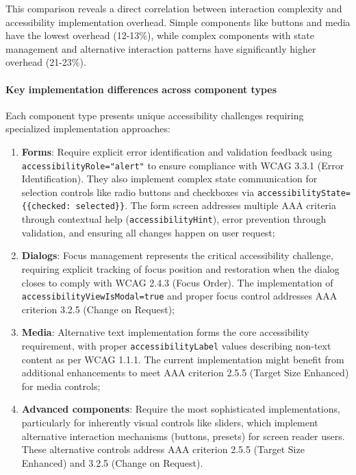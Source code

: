 This comparison reveals a direct correlation between interaction complexity and accessibility implementation overhead. Simple components like buttons and media have the lowest overhead (12-13\%), while complex components with state management and alternative interaction patterns have significantly higher overhead (21-23\%).

\paragraph{Key implementation differences across component types}

Each component type presents unique accessibility challenges requiring specialized implementation approaches:

\begin{enumerate}
    \item \textbf{Forms}: Require explicit error identification and validation feedback using \\ \texttt{accessibilityRole="alert"} to ensure compliance with WCAG 3.3.1 (Error Identification). They also implement complex state communication for selection controls like radio buttons and checkboxes via \texttt{accessibilityState=\{\{checked: selected\}\}}. The form screen addresses multiple AAA criteria through contextual help (\texttt{accessibilityHint}), error prevention through validation, and ensuring all changes happen on user request;
    
    \item \textbf{Dialogs}: Focus management represents the critical accessibility challenge, requiring explicit tracking of focus position and restoration when the dialog closes to comply with WCAG 2.4.3 (Focus Order). The implementation of \texttt{accessibilityViewIsModal=true} and proper focus control addresses AAA criterion 3.2.5 (Change on Request);
    
    \item \textbf{Media}: Alternative text implementation forms the core accessibility requirement, with proper \texttt{accessibilityLabel} values describing non-text content as per WCAG 1.1.1. The current implementation might benefit from additional enhancements to meet AAA criterion 2.5.5 (Target Size Enhanced) for media controls;
    
    \item \textbf{Advanced components}: Require the most sophisticated implementations, particularly for inherently visual controls like sliders, which implement alternative interaction mechanisms (buttons, presets) for screen reader users. These alternative controls address AAA criterion 2.5.5 (Target Size Enhanced) and 3.2.5 (Change on Request).
\end{enumerate}


